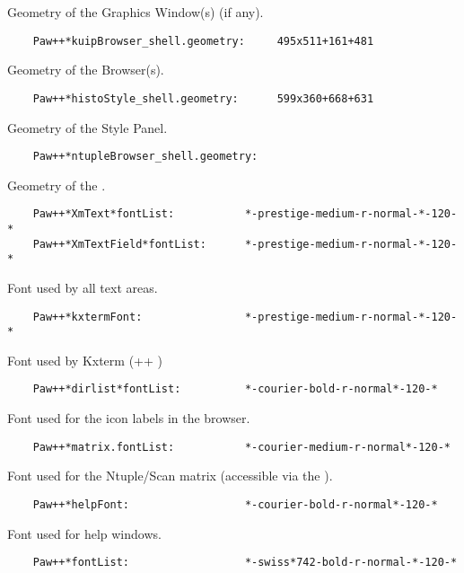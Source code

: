    Geometry of the Graphics Window(s) (if any).

\begin{verbatim}
    Paw++*kuipBrowser_shell.geometry:     495x511+161+481
\end{verbatim}

   Geometry of the Browser(s).

\begin{verbatim}
    Paw++*histoStyle_shell.geometry:      599x360+668+631
\end{verbatim}

   Geometry of the Style Panel.

\begin{verbatim}
    Paw++*ntupleBrowser_shell.geometry:
\end{verbatim}

   Geometry of the \NV.

\begin{verbatim}
    Paw++*XmText*fontList:           *-prestige-medium-r-normal-*-120-*
    Paw++*XmTextField*fontList:      *-prestige-medium-r-normal-*-120-*
\end{verbatim}

   Font used by all text areas.

\begin{verbatim}
    Paw++*kxtermFont:                *-prestige-medium-r-normal-*-120-*
\end{verbatim}

   Font used by Kxterm (\PAW++{} \EW)

\begin{verbatim}
    Paw++*dirlist*fontList:          *-courier-bold-r-normal*-120-*
\end{verbatim}

   Font used for the icon labels in the browser.

\begin{verbatim}
    Paw++*matrix.fontList:           *-courier-medium-r-normal*-120-*
\end{verbatim}

   Font used for the Ntuple/Scan matrix (accessible via the \NV).

\begin{verbatim}
    Paw++*helpFont:                  *-courier-bold-r-normal*-120-*
\end{verbatim}

   Font used for help windows.

\begin{verbatim}
    Paw++*fontList:                  *-swiss*742-bold-r-normal-*-120-*
\end{verbatim}

